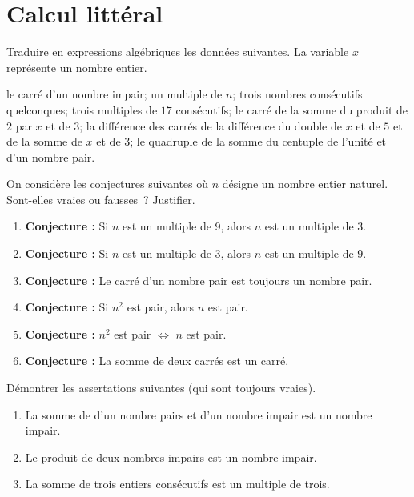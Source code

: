 \documentclass[a4paper,12pt]{article}
\begin{document}
\section{Calcul littéral}
\begin{activite}
	\tcblower
	Traduire en expressions algébriques les données suivantes. La variable $x$ représente un nombre entier.
	\begin{tasks}
\task le carré d'un nombre impair;
\task un multiple de $n$;
\task trois nombres consécutifs quelconques; 
\task trois multiples de $17$ consécutifs;
\task le carré de la somme du produit de $2$ par $x$ et de $3$;
\task la différence des carrés de la différence du double de $x$ et de $5$ et de la somme de $x$ et de $3$;
\task le quadruple de la somme du centuple de l'unité et d'un nombre pair.
\end{tasks}
\end{activite}
\begin{activite}
	\tcblower
	\begin{tasks}
		\task On considère les conjectures suivantes où $n$ désigne un nombre entier naturel. Sont-elles vraies ou fausses~? Justifier.
		\begin{enumerate}
			    \item \textbf{Conjecture :} Si $n$ est un multiple de 9, alors $n$ est un multiple de 3.
    
    \item \textbf{Conjecture :} Si $n$ est un multiple de 3, alors $n$ est un multiple de 9.
    
    \item \textbf{Conjecture :} Le carré d'un nombre pair est toujours un nombre pair.
    
    \item \textbf{Conjecture :} Si $n^2$ est pair, alors $n$ est pair.
    
    \item \textbf{Conjecture :} $n^2$ est pair $\Leftrightarrow$ $n$ est pair.
    \item \textbf{Conjecture :} La somme de deux carrés est un carré. 
		\end{enumerate}
		\task Démontrer les assertations suivantes (qui sont toujours vraies). 
		\begin{enumerate}
			\item La somme de d'un nombre pairs et d'un nombre impair est un nombre impair. 
			\item Le produit de deux nombres impairs est un nombre impair.
			\item La somme de trois entiers consécutifs est un multiple de trois. 
		\end{enumerate}
	\end{tasks}
\end{activite}
\end{document}
